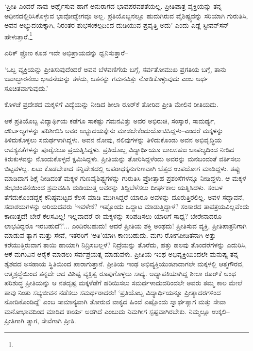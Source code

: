 ‘ಪ್ರೀತಿ ಎಂದರೆ ನಾವು ಅರ್ಥೈಸುವ ಹಾಗೆ ಅನುರಾಗದ ಭಾವಪರವಶತೆಯಲ್ಲ. ಪ್ರೀತಿಪಾತ್ರ ವ್ಯಕ್ತಿಯನ್ನು ತನ್ನ ಅಧೀನದಲ್ಲಿರಿಸಿಕೊಳ್ಳುವ ಭಾವೋದ್ವೇಗವೂ ಅಲ್ಲ. ಪ್ರತಿಯೊಬ್ಬನಲ್ಲೂ ಹುದು\-ಗಿರುವ ವೈಶಿಷ್ಟ್ಯವನ್ನು ಸರಿಯಾಗಿ ಗುರುತಿಸಿ, ಅವನ ಅಭ್ಯುದಯಕ್ಕಾಗಿ, ನಿರಂತರ ಶುಭಸಂಕಲ್ಪದಿಂದ ದುಡಿಯುವ ಪ್ರವೃತ್ತಿ ಅದು’ ಎಂದು ಎಡ್ಲೆ ಸ್ಟೀವನ್​ಸನ್ ಹೇಳುತ್ತಾರೆ.\footnote{\hfill{}}

ಎರಿಕ್ ಫ್ರೋಂ ಕೂಡ ಇದೇ ಅಭಿಪ್ರಾಯವನ್ನು ಧ್ವನಿಸುತ್ತಾರೆ–

‘ಒಬ್ಬ ವ್ಯಕ್ತಿಯನ್ನು ಪ್ರೀತಿಸುವುದೆಂದರೆ ಅವನ ಬೆಳವಣಿಗೆಯ ಬಗ್ಗೆ, ಸರ್ವತೋಮುಖ ಪ್ರಗತಿಯ ಬಗ್ಗೆ, ತಾನು ಜವಾಬ್ದಾರನೆಂಬ ಭಾವನೆಯನ್ನು ತಳೆದು, ಆತನನ್ನು ಗಮನವಿತ್ತು ನೋಡಿಕೊಳ್ಳುವುದು ಎಂಬ ಅರ್ಥ ಸೂಚಿತವಾಗುವುದು.’

\newpage

ಕೊಳಚೆ ಪ್ರದೇಶದ ಮಕ್ಕಳಿಗೆ ವಿದ್ಯೆಯನ್ನು ನೀಡಿದ ಶೀಲಾ ರೂರ್​ಕೆ ತೋರಿದ ಪ್ರೀತಿ ಮೇಲಿನ ರೀತಿಯದು.

ಆಕೆ ಪ್ರತಿಯೊಬ್ಬ ವಿದ್ಯಾರ್ಥಿಯ ಕಡೆಗೂ ಸಾಕಷ್ಟು ಗಮನವಿತ್ತು ಅವರ ಅಭಿರುಚಿ, ಸಂಸ್ಕಾರ, ಸಾಮರ್ಥ್ಯ, ದೌರ್ಬಲ್ಯಗಳನ್ನು ಪರಿಶೀಲಿಸಿ ಅವರ ಅಭ್ಯುದಯಕ್ಕೇನು ಮಾಡಬೇಕೆಂದು\break ಯೋಚಿಸಿದ್ದಳು–ಎಂದರೆ ಮಕ್ಕಳನ್ನು ತಿಳಿದುಕೊಳ್ಳಲು ಸಮರ್ಥಳಾಗಿದ್ದಳು. ಅವನ ನೋವು, ನಲಿವುಗಳನ್ನು ತಿಳಿದುಕೊಂಡು ಅವನ ಅಭಿವೃದ್ಧಿಯ ಆವಶ್ಯಕತೆಗಳನ್ನು ಪೂರೈಸಲೂ ಪ್ರಯತ್ನಿ\-ಸಿದ್ದಳು. ಪ್ರತಿಯೊಬ್ಬ ವಿದ್ಯಾರ್ಥಿಯೂ ಬಾಲಸಹಜ ಚಾಪಲ್ಯದಿಂದ ನೀಡಿದ ಕಿರುಕುಳವನ್ನು ನೊಂದುಕೊಳ್ಳದೆ ಕ್ಷಮಿಸಿದ್ದಳು. ಪ್ರೀತಿಯನ್ನು ತೋರಿಸಿದ್ದಳೆಂದು ಅವರನ್ನು ಮನಬಂದಂತೆ ವರ್ತಿಸಲು ಬಿಟ್ಟವಳಲ್ಲ. ಏಟು ಕೊಡಬೇಕಾದ ಸನ್ನಿವೇಶದಲ್ಲಿ ಅಪರಾಧಕ್ಕನುಗುಣವಾಗಿ ಬೆತ್ತದ ಉಪಯೋಗ ಮಾಡಿದ್ದಳು. ತಪ್ಪು ಮಾಡಿದಾಗ ಶಿಕ್ಷೆ ನೀಡಿದಂತೆ ಮಕ್ಕಳ ಗುಣವೈಶಿಷ್ಟ್ಯಗಳನ್ನು ಗುರುತಿಸಿ ಪ್ರೋತ್ಸಾಹ ಪ್ರಶಂಸೆಗಳನ್ನೂ ನೀಡಿದ್ದಳು. ಆ ಮಕ್ಕಳ ಶುಭಚಿಂತನೆಯಿಂದ ಶ್ರಮವಹಿಸಿ ದುಡಿಯುತ್ತ ಅವರನ್ನು ತಿದ್ದಿಬೆಳೆಸಲು ದೀರ್ಘಕಾಲ ಯತ್ನಿಸಿದಳು. ಸಂಬಳ ತೆಗೆದುಕೊಂಡದ್ದಕ್ಕೆ ಕನಿಷ್ಠಮಟ್ಟದ ಕೆಲಸ ಮಾಡಿ ಮುಗಿಸಿದ್ದರೆ ಯಾರೂ ಅವಳನ್ನು ದೂರುತ್ತಿರಲಿಲ್ಲ. ಅವಳ ಸದ್ಭಾವನೆ, ಸದಾಶಯಗಳನ್ನು ಅರಿಯದವರು ‘ಇವಳೇಕೆ? ಇಷ್ಟೊಂದು ಒದ್ದಾಟ ಮಾಡುತ್ತಿದ್ದಾಳೆ? ಸಂಸಾರದ ತಾಪತ್ರಯವಿಲ್ಲವೆಂದು ಕಾಣುತ್ತದೆ! ಬೇರೆ ಕೆಲಸವಿಲ್ಲ! ಇಲ್ಲವಾದರೆ ಈ ಮಕ್ಕಳನ್ನು ಸರಿಪಡಿಸಲು ಯಾರಿಗೆ ಸಾಧ್ಯ? ಬೇರೇನಾದರೂ ಲಾಭವಿದ್ದರೂ ಇರಬಹುದೆ?’... ಎಂದಿರಬಹುದು! ಆದರೆ ಪ್ರೀತಿಯ ಶಕ್ತಿ ಅಂಥದು! ಪ್ರೀತಿಸುವ ವ್ಯಕ್ತಿ, ಪ್ರೀತಿಪಾತ್ರನಿಗಾಗಿ ಮಾಡುವ ತ್ಯಾಗ ಮತ್ತು ಸೇವೆ, ಇತರರಿಗೆ ‘ಅತಿ’ಯಾಗಿ ಕಾಣಬಹುದು. ಮಗು ರೋಗಪೀಡಿತನಾಗಿ ಅತ್ತು ಕರೆಯುತ್ತಿರುವಾಗ ತಾಯಿ ಹಾಯಾಗಿ ನಿದ್ರಿಸಬಲ್ಲಳೆ? ನಿದ್ರೆಯನ್ನು ತೊರೆದು, ಹತ್ತು ಹಲವು ತೊಂದರೆಗಳನ್ನು ಎದುರಿಸಿ, ಆಕೆ ಮಗುವಿನ ಆರೈಕೆ ಮಾಡಲು ಸರ್ವಪ್ರಯತ್ನ ಮಾಡುವಳು. ಪ್ರೀತಿಯ ಇಂಥ ಅಭಿವ್ಯಕ್ತಿಯಿಂದಲೇ ಮನುಷ್ಯ ತನ್ನ ಶೈಶವದ ಅಸಹಾಯ ಸ್ಥಿತಿಯಿಂದ ಪಾರಾಗುತ್ತಾನೆ. ಪ್ರೀತಿಯ ಇಂಥ ಅಭಿವ್ಯಕ್ತಿಯುಂಟಾದಾಗಲೇ ಮಕ್ಕಳಲ್ಲಿ ಆತ್ಮಗೌರವ, ಆತ್ಮಶ್ರದ್ಧೆಯಿಂದ ತನ್ನದೇ ಆದ ವಿಶಿಷ್ಟ ವ್ಯಕ್ತಿತ್ವ ರೂಪುಗೊಳ್ಳಲು ಸಾಧ್ಯ. ಅಧ್ಯಾಪಕಿಯಾಗಿದ್ದ ಶೀಲಾ ರೂರ್​ಕೆ ಅಂಥ ಪರಿಶುದ್ಧ ಪ್ರೀತಿಯನ್ನು ಆ ನತದೃಷ್ಟ ಮಕ್ಕಳೆಡೆಗೆ ಹರಿಯಿಸಲು ಸಮರ್ಥಳಾದುದರಿಂದಲೇ ಅವರು ತಮ್ಮ ಕಾಲ ಮೇಲೆ ತಾವು ನಿಂತು ಸಭ್ಯಜೀವನ ನಡೆಸಲು ಸಮರ್ಥರಾದರು! ‘ಪ್ರತಿಯೊಬ್ಬ ವಿದ್ಯಾರ್ಥಿಯನ್ನೂ ಪ್ರೀತ್ಯಾದರಗಳಿಂದ ನೋಡಿಕೊಂಡಿದ್ದೆ’ ಎಂಬ ಸಾಮಾನ್ಯವಾಗಿ ತೋರುವ ವಾಕ್ಯದ ಹಿಂದೆ ಎಷ್ಟೊಂದು ಸ್ವಾರ್ಥತ್ಯಾಗ ಮತ್ತು ಸೇವಾ ಮನೋಭಾವದಿಂದ ಮಾಡಿದ ಕಾರ್ಯ ಅಡಗಿದೆ ಎಂಬುದು ನಿಮಗೀಗ ಸ್ಪಷ್ಟವಾಗಿರಬೇಕು. ನಿಮ್ಮಲ್ಲೂ ಉಕ್ಕಲಿ–ಪ್ರೀತಿಗಾಗಿ ತ್ಯಾಗ, ಸೇವೆಗಾಗಿ ಪ್ರೀತಿ.


